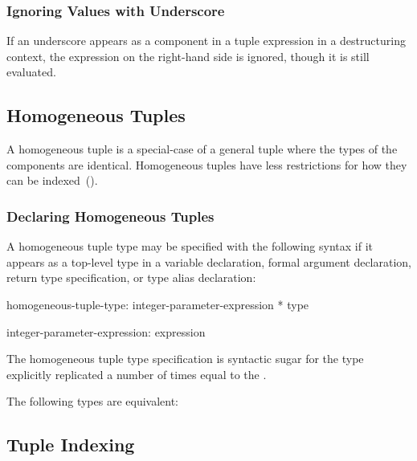 \subsubsection{Ignoring Values with Underscore}
\label{Ignoring_Values_with_Underscore}

If an underscore appears as a component in a tuple expression in a
destructuring context, the expression on the right-hand side is
ignored, though it is still evaluated.

\subsection{Homogeneous Tuples}
\label{Homogeneous_Tuples}

A homogeneous tuple is a special-case of a general tuple where the
types of the components are identical.  Homogeneous tuples have less
restrictions for how they can be indexed~().

\subsubsection{Declaring Homogeneous Tuples}
\label{Declaring_Homogeneous_Tuples}


A homogeneous tuple type may be specified with the following syntax if
it appears as a top-level type in a variable declaration, formal
argument declaration, return type specification, or type alias
declaration:
\begin{syntax}
homogeneous-tuple-type:
  integer-parameter-expression * type

integer-parameter-expression:
  expression
\end{syntax}
The homogeneous tuple type specification is syntactic sugar for the
type explicitly replicated a number of times equal to the
.
\begin{example}
The following types are equivalent:
\begin{center}
 \hspace{2pc} 
\end{center}
\end{example}

\subsection{Tuple Indexing}
\label{Tuple_Indexing}

